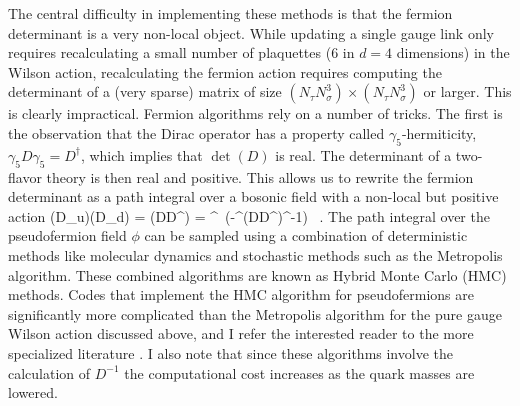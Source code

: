  The central difficulty in implementing these methods is that the 
fermion determinant is a very non-local object. While updating a
single gauge link only requires recalculating a small number of 
plaquettes (6 in $d=4$ dimensions) in the Wilson action, recalculating
the fermion action requires computing the determinant of a (very sparse) 
matrix of size $(N_\tau N_\sigma^3)\times(N_\tau N_\sigma^3)$ or larger. 
This is clearly impractical. Fermion algorithms rely on a number of 
tricks. The first is the observation that the Dirac operator has a 
property called $\gamma_5$-hermiticity, $\gamma_5 D\gamma_5=D^\dagger$,
which implies that $\det(D)$ is real. The determinant of a two-flavor 
theory is then real and positive. This allows us to rewrite the 
fermion determinant as a path integral over a bosonic field with a 
non-local but positive action
\be 
\det(D_u)\det(D_d) = 
\det(DD^\dagger) = \phi^\dagger\, 
  \exp(-\phi^\dagger (DD^\dagger)^{-1}\phi) \, . 
\ee
The path integral over the pseudofermion field $\phi$ can be sampled 
using a combination of deterministic methods like molecular dynamics 
and stochastic methods such as the Metropolis algorithm. These combined 
algorithms are known as Hybrid Monte Carlo (HMC) methods. Codes that
implement the HMC algorithm for pseudofermions are significantly
more complicated than the Metropolis algorithm for the pure gauge
Wilson action discussed above, and I refer the interested reader 
to the more specialized literature \cite{Luscher:2010ae}. I also
note that since these algorithms involve the calculation of $D^{-1}$
the computational cost increases as the quark masses are lowered. 

